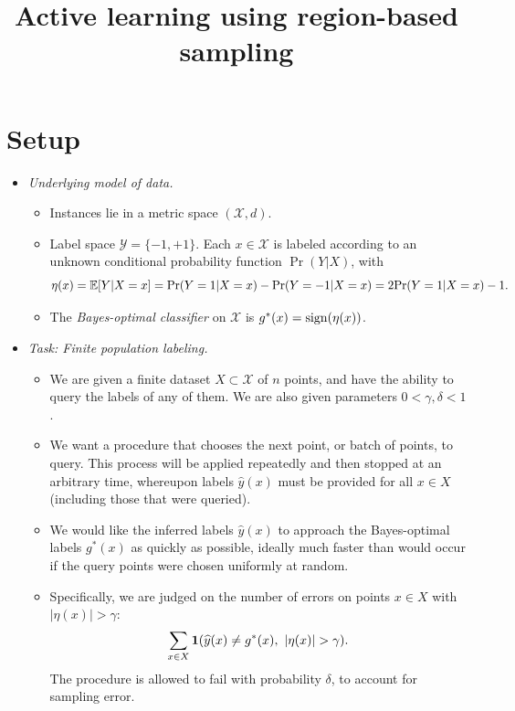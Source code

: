 \documentclass{article}
\title{Active learning using region-based sampling}
\def\pr{{\rm Pr}}
\def\E{{\mathbb E}}
\def\X{{\mathcal X}}
\def\Y{{\mathcal Y}}
\def\yh{{\widehat{y}}}
\def\sign{{\rm sign}}
\begin{document}
\maketitle

\section{Setup}

\begin{itemize}
\item {\it Underlying model of data.}

\begin{itemize}
\item Instances lie in a metric space $(\X, d)$. 
\item Label space $\Y = \{-1,+1\}$. Each $x \in \X$ is labeled according to an unknown conditional probability function $\Pr(Y|X)$, with
$$ \eta(x) = \E[Y | X=x] = \pr(Y=1|X=x) - \pr(Y=-1|X=x) = 2 \pr(Y=1|X=x) - 1 .$$
\item The {\it Bayes-optimal classifier} on $\X$ is $g^*(x) = \sign(\eta(x))$.
\end{itemize}

\item {\it Task: Finite population labeling.}

\begin{itemize}
\item We are given a finite dataset $X \subset \X$ of $n$ points, and have the ability to query the labels of any of them. We are also given parameters $0 < \gamma, \delta < 1$.
\item We want a procedure that chooses the next point, or batch of points, to query. This process will be applied repeatedly and then stopped at an arbitrary time, whereupon labels $\yh(x)$ must be provided for all $x \in X$ (including those that were queried).
\item We would like the inferred labels $\yh(x)$ to approach the Bayes-optimal labels $g^*(x)$ as quickly as possible, ideally much faster than would occur if the query points were chosen uniformly at random.
\item Specifically, we are judged on the number of errors on points $x \in X$ with $|\eta(x)| > \gamma$:
$$ \sum_{x \in X} {\bf 1}(\yh(x) \neq g^*(x),\ |\eta(x)| > \gamma) .$$
The procedure is allowed to fail with probability $\delta$, to account for sampling error.
\end{itemize}

\end{itemize}
\end{document}
